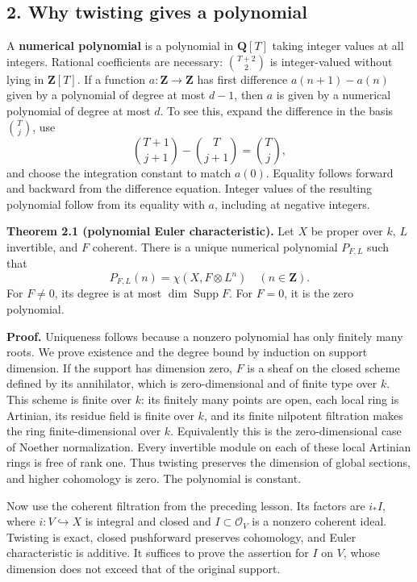 \documentclass[11pt]{article}
\begin{document}
\subsection{2. Why twisting gives a
polynomial}\label{why-twisting-gives-a-polynomial}

A \textbf{numerical polynomial} is a polynomial in \(\mathbf Q[T]\)
taking integer values at all integers. Rational coefficients are
necessary: \(\binom{T+2}{2}\) is integer-valued without lying in
\(\mathbf Z[T]\). If a function \(a:\mathbf Z\to\mathbf Z\) has first
difference \(a(n+1)-a(n)\) given by a polynomial of degree at most
\(d-1\), then \(a\) is given by a numerical polynomial of degree at most
\(d\). To see this, expand the difference in the basis \(\binom{T}{j}\),
use \[
\binom{T+1}{j+1}-\binom{T}{j+1}=\binom{T}{j},
\] and choose the integration constant to match \(a(0)\). Equality
follows forward and backward from the difference equation. Integer
values of the resulting polynomial follow from its equality with \(a\),
including at negative integers.

\textbf{Theorem 2.1 (polynomial Euler characteristic).} Let \(X\) be
proper over \(k\), \(L\) invertible, and \(F\) coherent. There is a
unique numerical polynomial \(P_{F,L}\) such that \[
P_{F,L}(n)=\chi(X,F\otimes L^n)\quad(n\in\mathbf Z).
\] For \(F\ne0\), its degree is at most \(\dim\operatorname{Supp}F\).
For \(F=0\), it is the zero polynomial.

\textbf{Proof.} Uniqueness follows because a nonzero polynomial has only
finitely many roots. We prove existence and the degree bound by
induction on support dimension. If the support has dimension zero, \(F\)
is a sheaf on the closed scheme defined by its annihilator, which is
zero-dimensional and of finite type over \(k\). This scheme is finite
over \(k\): its finitely many points are open, each local ring is
Artinian, its residue field is finite over \(k\), and its finite
nilpotent filtration makes the ring finite-dimensional over \(k\).
Equivalently this is the zero-dimensional case of Noether normalization.
Every invertible module on each of these local Artinian rings is free of
rank one. Thus twisting preserves the dimension of global sections, and
higher cohomology is zero. The polynomial is constant.

Now use the coherent filtration from the preceding lesson. Its factors
are \(i_*I\), where \(i:V\hookrightarrow X\) is integral and closed and
\(I\subset\mathcal O_V\) is a nonzero coherent ideal. Twisting is exact,
closed pushforward preserves cohomology, and Euler characteristic is
additive. It suffices to prove the assertion for \(I\) on \(V\), whose
dimension does not exceed that of the original support.
\end{document}
